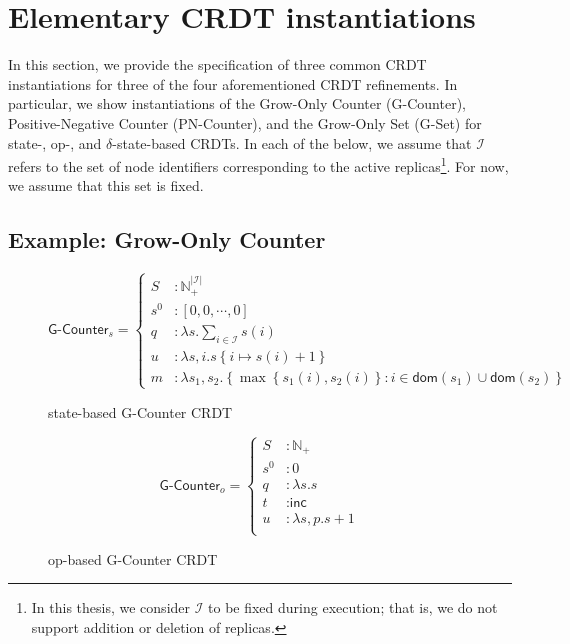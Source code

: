 \section{Elementary CRDT instantiations}
In this section, we provide the specification of three common CRDT instantiations
for three of the four aforementioned CRDT refinements. In particular, we show
instantiations of the Grow-Only Counter (G-Counter), Positive-Negative Counter
(PN-Counter), and the Grow-Only Set (G-Set) for state-, op-, and
$\delta$-state-based CRDTs. In each of the below, we assume that $\mathcal{I}$
refers to the set of node identifiers corresponding to the active
replicas\footnote{In this thesis, we consider $\mathcal{I}$ to be fixed during
execution; that is, we do not support addition or deletion of replicas.}. For
now, we assume that this set is fixed.

\subsection{Example: Grow-Only Counter}
\label{sec:example-gcounter}

\begin{figure}[H]
  \centering
  \[
    \textsf{G-Counter}_s = \left\{\begin{aligned}
      S &: \mathbb{N}_+^{|\mathcal{I}|} \\
      s^0 &: \left[ 0, 0, \cdots, 0 \right] \\
      q &: \lambda s. \sum_{i \in \mathcal{I}} s(i) \\
      u &: \lambda s,i. s\left\{ i \mapsto s(i) + 1 \right\} \\
      m &: \lambda s_1, s_2. \left\{ \max\left\{ s_1(i), s_2(i) \right\}: i \in \mathsf{dom}(s_1) \cup
      \mathsf{dom}(s_2) \right\}
    \end{aligned}\right.
  \]
  \caption{state-based \textsf{G-Counter} CRDT}
\end{figure}

\begin{figure}[H]
  \centering
  \[
    \textsf{G-Counter}_o = \left\{\begin{aligned}
      S &: \mathbb{N}_+ \\
      s^0 &: 0 \\
      q &: \lambda s. s \\
      t &: \textsf{inc} \\
      u &: \lambda s,p. s + 1 \\
    \end{aligned}\right.
  \]
  \caption{op-based \textsf{G-Counter} CRDT}
\end{figure}

